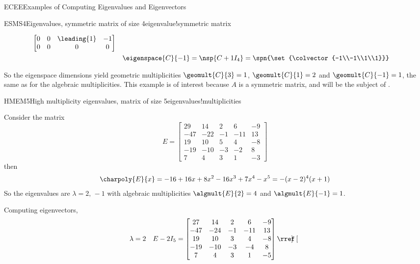 \begin{subsect}{ECEE}{Examples of Computing Eigenvalues and Eigenvectors}
\begin{example}{ESMS4}{Eigenvalues, symmetric matrix of size 4}{eigenvalue!symmetric matrix}
\begin{para}
\begin{align*}
\begin{bmatrix}
0 & 0 & \leading{1} & -1\\
0 & 0 & 0 & 0
\end{bmatrix}\\
&&\eigenspace{C}{-1}&=\nsp{C+1I_4}
=\spn{\set{\colvector{-1\\-1\\1\\1}}}\\
%
\end{align*}
\end{para}
%
\begin{para}So the eigenspace dimensions yield geometric multiplicities $\geomult{C}{3}=1$, $\geomult{C}{1}=2$ and $\geomult{C}{-1}=1$, the same as for the algebraic multiplicities.  This example is of interest because $A$ is a symmetric matrix, and will be the subject of .\end{para}
%
\end{example}
%
\begin{example}{HMEM5}{High multiplicity eigenvalues, matrix of size 5}{eigenvalues!multiplicities}
\begin{para}Consider the matrix
%
\begin{equation*}
E=
\begin{bmatrix}
29 & 14 & 2 & 6 & -9\\
-47 & -22 & -1 & -11 & 13\\
19 & 10 & 5 & 4 & -8\\
-19 & -10 & -3 & -2 & 8\\
7 & 4 & 3 & 1 & -3
\end{bmatrix}
\end{equation*}
%
then
%
\begin{equation*}
\charpoly{E}{x}=-16+16x+8x^2-16x^3+7x^4-x^5=-(x-2)^4(x+1)
\end{equation*}
%
So the eigenvalues are $\lambda=2,\,-1$ with algebraic multiplicities $\algmult{E}{2}=4$  and $\algmult{E}{-1}=1$.\end{para}
%
\begin{para}Computing eigenvectors,
%
\begin{align*}
\lambda&=2&E-2I_5&=
\begin{bmatrix}
27 & 14 & 2 & 6 & -9\\
-47 & -24 & -1 & -11 & 13\\
19 & 10 & 3 & 4 & -8\\
-19 & -10 & -3 & -4 & 8\\
7 & 4 & 3 & 1 & -5
\end{bmatrix}
\rref
\begin{bmatrix}

\end{bmatrix}
\end{align*}
\end{para}
\end{example}
\end{subsect}

